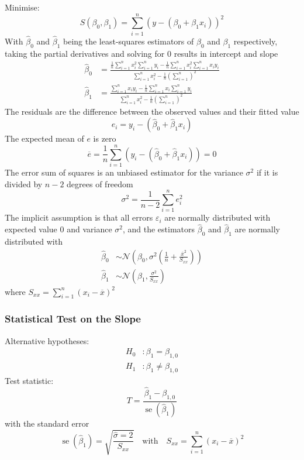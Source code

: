 \documentclass[11pt]{article}
\theoremstyle{definition}
\newcommand*\samplemean[1]{\overline{#1}}
\newcommand*\N[1]{\mathcal{N}\left(#1\right)}
\newcommand*\se[1]{\mathop{\text{se}}\left(#1\right)}
\begin{document}
\vspace{1em}
\noindent
Minimise:
\begin{equation*}
	S(\beta_0, \beta_1) = \sum_{i=1}^{n} \left(y - (\beta_0 + \beta_1 x_i)\right)^2
\end{equation*}
With $\hat{\beta}_0$ and $\hat{\beta}_1$ being the least-squares estimators of $\beta_0$ and $\beta_1$ respectively, taking the partial derivatives and solving for $0$ results in intercept and slope
\begin{align*}
	\hat{\beta}_0 &= \frac{\frac{1}{n}\sum_{i=1}^{n} x_i^2 \sum_{i=1}^{n}y_i - \frac{1}{n}\sum_{i=1}^{n} x_i^2 \sum_{i=1}^{n}x_i y_i}{\sum_{i=1}^{n}x_i^2 - \frac{1}{n}\left(\sum_{i=1}^{n}\right)^2}\\
	\hat{\beta}_1 &= \frac{\sum_{i=1}^{n}x_i y_i - \frac{1}{n}\sum_{i=1}^{n}x_i\sum_{i=1}^{n}y_i}{\sum_{i=1}^{n}x_i^2 - \frac{1}{n}\left(\sum_{i=1}^{n}\right)^2}
\end{align*}
The residuals are the difference between the observed values and their fitted value
\begin{equation*}
	e_i = y_i - (\hat{\beta}_0 + \hat{\beta}_1 x_i)
\end{equation*}
The expected mean of $e$ is zero
\begin{equation*}
	\samplemean{e} = \frac{1}{n}\sum_{i=1}^{n}\left(y_i - (\hat{\beta}_0 + \hat{\beta}_1 x_i)\right) = 0
\end{equation*}
The error sum of squares is an unbiased estimator for the variance $\sigma^2$ if it is divided by $n-2 $ degrees of freedom
\begin{equation*}
	\sigma^2 = \frac{1}{n-2} \sum_{i=1}^{n} e_i^2
\end{equation*}
The implicit assumption is that all errors $\varepsilon_i$ are normally distributed with expected value $0$ and variance $\sigma^2$, and the estimators $\hat{\beta}_0$ and $\hat{\beta}_1$ are normally distributed with
\begin{align*}
	\hat{\beta}_0 &\sim \N{\beta_0, \sigma^2\left(\frac{1}{n}+\frac{\samplemean{x}^2}{S_{xx}}\right)}\\
	\hat{\beta}_1 &\sim \N{\beta_1, \frac{\sigma^2}{S_{xx}}}
\end{align*}
where $S_{xx} = \sum_{i=1}^{n}(x_i - \samplemean{x})^2$

\subsubsection{Statistical Test on the Slope}
Alternative hypotheses:
\begin{align*}
	H_0 &: \beta_1 = \beta_{1,0}\\
	H_1 &: \beta_1 \neq \beta_{1,0}
\end{align*}
Test statistic:
\begin{equation*}
	T = \frac{\hat{\beta}_1 - \beta_{1,0}}{\se{\hat{\beta}_1}}
\end{equation*}
with the standard error
\begin{equation*}
	\se{\hat{\beta}_1} = \sqrt{\frac{\hat{\sigma}=2}{S_{xx}}}\quad\text{with}\quad S_{xx} = \sum_{i=1}^{n}(x_i - \samplemean{x})^2
\end{equation*}
\end{document}
